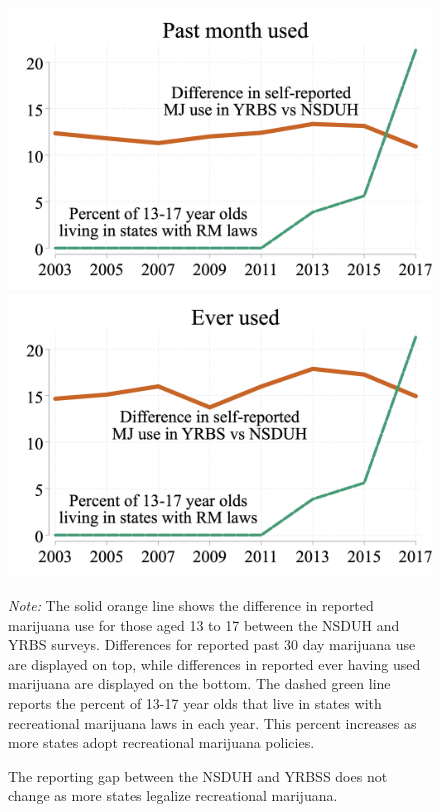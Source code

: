 \documentclass[12pt]{article}%
\begin{document}
\begin{figure}[H]
    \caption{The reporting gap between the NSDUH and YRBSS does not change as more states legalize recreational marijuana.}
    \begin{minipage}{.55\linewidth}
      \includegraphics[width=\linewidth]{../output/plots/marijuana_30_pop.png}
       \label{fig:yrbs_nsudh_monthly}
      \includegraphics[width=\linewidth]{../output/plots/marijuana_ever_pop.png}
       \label{fig:yrbs_nsudh_ever}
       \begin{justify}
                {\footnotesize
                    \emph{Note:} 
        The solid orange line shows the difference in reported marijuana use for those aged 13 to 17 between the NSDUH and YRBS surveys. 
        Differences for reported past 30 day marijuana use are displayed on top, while differences in reported ever having used marijuana are displayed on the bottom. 
        The dashed green line reports the percent of 13-17 year olds that live in states with recreational marijuana laws in each year. This percent increases as more states adopt recreational marijuana policies.
}
\end{justify}
\end{minipage}
\end{figure}
\end{document}
